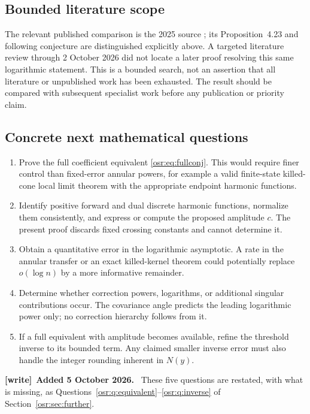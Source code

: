 \documentclass[11pt,letterpaper]{article}
\numberwithin{equation}{section}
\newenvironment{writenote}[1][]{\par\smallskip\begingroup\small
 \noindent\textbf{[write]}\if\relax\detokenize{#1}\relax\else~\textbf{#1.}\fi\ }%
 {\par\endgroup\smallskip}
\begin{document}
\subsection{Bounded literature scope}
The relevant published comparison is the 2025 source \cite{rect}; its Proposition~4.23 and following conjecture are distinguished explicitly above. A targeted literature review through 2 October 2026 did not locate a later proof resolving this same logarithmic statement. This is a bounded search, not an assertion that all literature or unpublished work has been exhausted. The result should be compared with subsequent specialist work before any publication or priority claim.

\subsection{Concrete next mathematical questions}
\begin{enumerate}
\item Prove the full coefficient equivalent \eqref{osr:eq:fullconj}. This would require finer control than fixed-error annular powers, for example a valid finite-state killed-cone local limit theorem with the appropriate endpoint harmonic functions.
\item Identify positive forward and dual discrete harmonic functions, normalize them consistently, and express or compute the proposed amplitude $c$. The present proof discards fixed crossing constants and cannot determine it.
\item Obtain a quantitative error in the logarithmic asymptotic. A rate in the annular transfer or an exact killed-kernel theorem could potentially replace $o(\log n)$ by a more informative remainder.
\item Determine whether correction powers, logarithms, or additional singular contributions occur. The covariance angle predicts the leading logarithmic power only; no correction hierarchy follows from it.
\item If a full equivalent with amplitude becomes available, refine the threshold inverse to its bounded term. Any claimed smaller inverse error must also handle the integer rounding inherent in $N(y)$.
\end{enumerate}
\begin{writenote}[Added 5 October 2026]
These five questions are restated, with what is missing, as
Questions~\ref{osr:q:equivalent}--\ref{osr:q:inverse} of
Section~\ref{osr:sec:further}.
\end{writenote}
\end{document}
